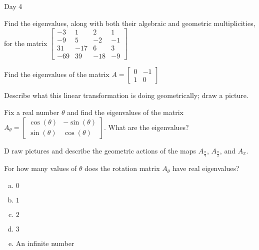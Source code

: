 \begin{applicationActivities}{Day 4}
\begin{activity}
   Find the eigenvalues, along with both their algebraic and geometric multiplicities, for the matrix $\begin{bmatrix} -3 & 1 & 2 & 1 \\ -9 & 5 & -2 & -1 \\ 31 & -17 & 6 & 3 \\ -69 & 39 & -18 & -9 \end{bmatrix}$
\end{activity}

\begin{activity}
  Find the eigenvalues of the matrix $A=\begin{bmatrix}0 & -1 \\ 1 & 0 \end{bmatrix}$
\end{activity}

\begin{activity}
   Describe what this linear transformation is doing geometrically; draw a picture.
\end{activity}

\begin{activity}
   Fix a real number $\theta$ and find the eigenvalues of the matrix $A_{\theta} = \begin{bmatrix} \cos(\theta) & -\sin(\theta) \\ \sin(\theta) & \cos (\theta) \end{bmatrix}$.  What are the eigenvalues?
\end{activity}

\begin{activity} D
  raw pictures and describe the geometric actions of the maps $A_{\frac{\pi}{4
  }}$, $A_{\frac{\pi}{2}}$, and $A_{\pi}$.
\end{activity}

\begin{activity}
  For how many values of $\theta$ does the rotation matrix $A_\theta$ have real eigenvalues?
\begin{enumerate}[(a)]
\item $0$
\item $1$
\item $2$
\item $3$
\item An infinite number
\end{enumerate}
\end{activity}

\end{applicationActivities}
